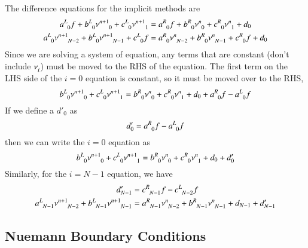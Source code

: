 \documentclass[letterpaper,12pt]{article}
\newcommand \bcf{f}
\begin{document}
The difference equations for the implicit methods are
\begin{align}
  a\indices{^L_0} \bcf
+ b\indices{^L_0} \nu\indices{^{n+1}_{0}}
+ c\indices{^L_0} \nu\indices{^{n+1}_{1}}
&
=
  a\indices{^R_0} \bcf
+ b\indices{^R_0} \nu\indices{^{n  }_{0}}
+ c\indices{^R_0} \nu\indices{^{n  }_{1}}
+ d_0
\\
  a\indices{^L_0} \nu\indices{^{n+1}_{N-2}}
+ b\indices{^L_0} \nu\indices{^{n+1}_{N-1}}
+ c\indices{^L_0} \bcf
&
=
  a\indices{^R_0} \nu\indices{^{n  }_{N-2}}
+ b\indices{^R_0} \nu\indices{^{n  }_{N-1}}
+ c\indices{^R_0} \bcf
+ d_0
\end{align}
Since we are solving a system of equation, any terms that are constant (don't include $\nu\indices{_{i}}$) must be moved to the RHS of the equation.
The first term on the LHS side of the $i=0$ equation is constant, so it must be moved over to the RHS,
\begin{equation}
  b\indices{^L_0} \nu\indices{^{n+1}_{0}}
+ c\indices{^L_0} \nu\indices{^{n+1}_{1}}
=
  b\indices{^R_0} \nu\indices{^{n  }_{0}}
+ c\indices{^R_0} \nu\indices{^{n  }_{1}}
+ d_0
+ a\indices{^R_0} \bcf
- a\indices{^L_0} \bcf
\end{equation}
If we define a $d'_0$ as
\begin{equation}
d'_0 = a\indices{^R_0} \bcf - a\indices{^L_0} \bcf
\end{equation}
then we can write the $i=0$ equation as
\begin{equation}
  b\indices{^L_0} \nu\indices{^{n+1}_{0}}
+ c\indices{^L_0} \nu\indices{^{n+1}_{1}}
=
  b\indices{^R_0} \nu\indices{^{n  }_{0}}
+ c\indices{^R_0} \nu\indices{^{n  }_{1}}
+ d_0
+ d'_0
\end{equation}
Similarly, for the $i=N-1$ equation, we have
\begin{align}
  d'_{N-1} &= c\indices{^R_{N-1}} \bcf - c\indices{^L_{N-2}} \bcf
 \\
  a\indices{^L_{N-1}} \nu\indices{^{n+1}_{N-2}}
+ b\indices{^L_{N-1}} \nu\indices{^{n+1}_{N-1}}
  &
=
  a\indices{^R_{N-1}} \nu\indices{^{n  }_{N-2}}
+ b\indices{^R_{N-1}} \nu\indices{^{n  }_{N-1}}
+ d_{N-1}
+ d'_{N-1}
\end{align}




\subsection{Nuemann Boundary Conditions}
\end{document}
